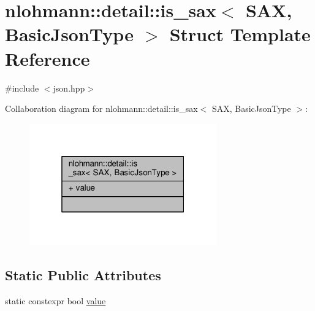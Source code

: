 \hypertarget{structnlohmann_1_1detail_1_1is__sax}{}\section{nlohmann\+:\+:detail\+:\+:is\+\_\+sax$<$ S\+AX, Basic\+Json\+Type $>$ Struct Template Reference}
\label{structnlohmann_1_1detail_1_1is__sax}


{\ttfamily \#include $<$json.\+hpp$>$}



Collaboration diagram for nlohmann\+:\+:detail\+:\+:is\+\_\+sax$<$ S\+AX, Basic\+Json\+Type $>$\+:
\nopagebreak
\begin{figure}[H]
\begin{center}
\leavevmode
\includegraphics[width=229pt]{structnlohmann_1_1detail_1_1is__sax__coll__graph}
\end{center}
\end{figure}
\subsection*{Static Public Attributes}
\begin{DoxyCompactItemize}
\item 
static constexpr bool \hyperlink{structnlohmann_1_1detail_1_1is__sax_a8ab7e51087000e948b4a2492257484dc}{value}
\end{DoxyCompactItemize}
